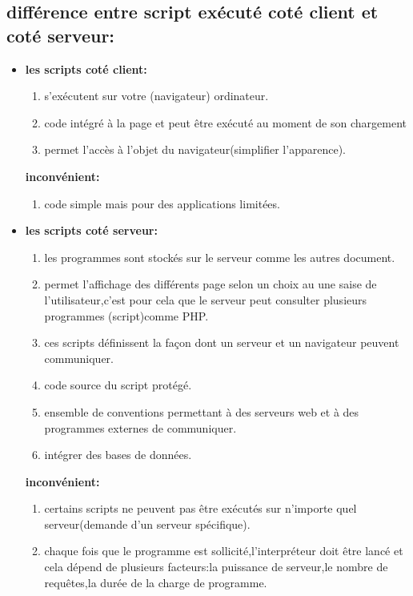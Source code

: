 \subsection{différence entre script exécuté coté client et coté serveur:}
\begin{itemize}
	\item \textbf{les scripts coté client:}
	\begin{enumerate}
		\item s'exécutent sur votre (navigateur) ordinateur.
		\item code intégré à la page et peut être exécuté au moment de son chargement
		\item permet l'accès à l'objet du navigateur(simplifier l'apparence).
	\end{enumerate}
	\subitem \textbf{inconvénient:}
	\begin{enumerate}
		\item code simple mais pour des applications limitées.
	\end{enumerate}
	\item \textbf{les scripts coté serveur:}
	\begin{enumerate}
		\item les programmes sont stockés sur le serveur comme les autres document.
		\item permet l'affichage des différents page selon un choix au une saise de l'utilisateur,c'est pour cela que le serveur peut consulter plusieurs programmes (script)comme PHP.
		\item ces scripts définissent la façon dont un serveur et un navigateur peuvent communiquer.
		\item code source du script protégé.
		\item ensemble de conventions permettant à des serveurs web et à des programmes externes de communiquer.
		\item intégrer des bases de données.
	\end{enumerate}
		\subitem \textbf{inconvénient:}
	\begin{enumerate}
		\item certains scripts ne peuvent pas être exécutés sur n'importe quel serveur(demande d'un serveur spécifique).
		\item chaque fois que le programme est sollicité,l'interpréteur doit être lancé et cela dépend de plusieurs facteurs:la puissance de serveur,le nombre de requêtes,la durée de la charge de programme.
	\end{enumerate}
\end{itemize}
